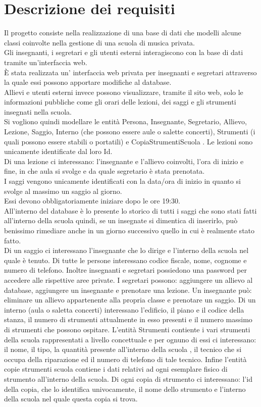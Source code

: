 \documentclass{article}
\begin{document}
\section{Descrizione dei requisiti}
Il progetto consiste nella realizzazione di una base di dati che modelli alcune
classi coinvolte nella gestione di una scuola di musica privata.\\
Gli insegnanti, i segretari e gli utenti esterni interagiscono con la base di dati tramite 
un'interfaccia web.\\
È stata realizzata un' interfaccia web privata per insegnanti e segretari attraverso la quale essi possono apportare modifiche al database.\\
Allievi e utenti esterni invece possono visualizzare, tramite il sito web, solo le informazioni pubbliche come gli orari delle lezioni, dei saggi e gli strumenti insegnati nella scuola.\smallskip \\
Si vogliono quindi modellare le entità Persona, Insegnante, Segretario, Allievo, Lezione, Saggio, Interno (che possono essere aule o salette concerti), Strumenti (i quali possono essere stabili o portatili) e CopiaStrumentiScuola .
Le lezioni sono unicamente identificate dal loro Id.\\Di una lezione ci interessano: l'insegnante e l'allievo coinvolti, l'ora di inizio e fine, in che aula si svolge e da quale segretario è stata prenotata.\\
I saggi vengono unicamente identificati con la data/ora di inizio in quanto si svolge al massimo un saggio al giorno.\\
Essi devono obbligatoriamente iniziare dopo le ore 19:30.\\
All'interno del database è lo  presente lo storico di tutti i saggi che sono stati fatti all'interno della scuola quindi, se un insegnate si dimentica di inserirlo, può benissimo rimediare anche in un giorno successivo quello in cui è realmente stato fatto.\\
Di un saggio ci interessano l'insegnante che lo dirige e l'interno della scuola nel quale è tenuto.
Di tutte le persone interessano codice fiscale, nome, cognome e numero di telefono.
Inoltre insegnanti e segretari possiedono una password per accedere alle rispettive aree private.
I segretari possono: aggiungere un allievo al database, aggiungere un insegnante e prenotare una lezione.
Un insegnante può: eliminare un allievo appartenente alla propria classe e prenotare un saggio.
Di un interno (aula o saletta concerti) interessano l'edificio, il piano e il codice della stanza, il numero di strumenti attualmente in esso presenti e il numero massimo di strumenti che possono ospitare.
L'entità Strumenti contiente i vari strumenti della scuola rappresentati a livello concettuale e per ognuno di essi ci interessano: il nome, il tipo, la quantità presente all'interno della scuola , il tecnico che si occupa della riparazione ed il numero di telefono di tale tecnico.
Infine l'entità copie strumenti scuola contiene i dati relativi ad ogni esemplare fisico di strumento all'interno della scuola.
Di ogni copia di strumento ci interessano: l'id della copia, che lo identifica univocamente, il nome dello strumento e l'interno della scuola nel quale questa copia si trova.
\end{document}
